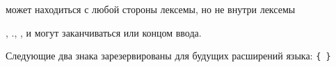  может находиться с любой стороны лексемы, но не внутри лексемы\vspace{1mm}

, {\cf .}, ,  и
 могут заканчиваться  или концом ввода.\vspace{1mm}

Следующие два знака зарезервированы для будущих расширений языка:
{\tt \verb"{" \verb"}"}\vspace{1mm}

